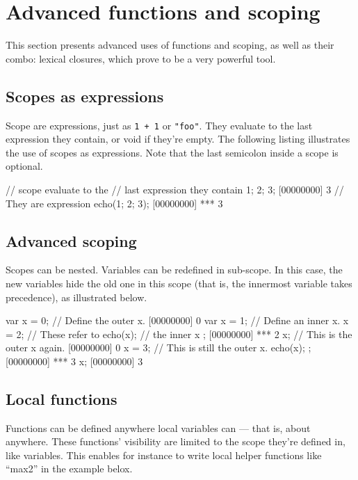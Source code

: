 \chapter{Advanced functions and scoping}

This section presents advanced uses of functions and scoping, as well
as their combo: lexical closures, which prove to be a very powerful
tool.

\section{Scopes as expressions}

Scope are expressions, just as \lstinline|1 + 1| or \lstinline|"foo"|.
They evaluate to the last expression they contain, or void if they're
empty. The following listing illustrates the use of scopes as
expressions. Note that the last semicolon inside a scope is optional.

\begin{urbiscript}
// scope evaluate to the
// last expression they contain
{ 1; 2; 3};
[00000000] 3
// They are expression
echo({1; 2; 3});
[00000000] *** 3
\end{urbiscript}

\section{Advanced scoping}

Scopes can be nested. Variables can be redefined in sub-scope. In this
case, the new variables hide the old one in this scope (that is, the
innermost variable takes precedence), as illustrated below.

\begin{urbiscript}
var x = 0; // Define the outer x.
[00000000] 0
{
  var x = 1; // Define an inner x.
  x = 2;     // These refer to
  echo(x);   // the inner x
};
[00000000] *** 2
x;           // This is the outer x again.
[00000000] 0
{
  x = 3;     // This is still the outer x.
  echo(x);
};
[00000000] *** 3
x;
[00000000] 3
\end{urbiscript}

\section{Local functions}

Functions can be defined anywhere local variables can --- that is,
about anywhere. These functions' visibility are limited to the scope
they're defined in, like variables. This enables for instance to write
local helper functions like ``max2'' in the example belox.

